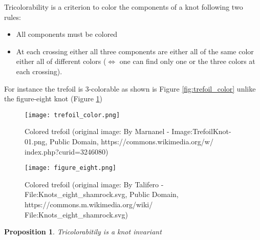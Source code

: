 \documentclass[12pt, a4paper]{article}
\newtheorem{proposition}{Proposition}
\begin{document}
Tricolorability is a criterion to color the components of a knot following two rules:

\begin{itemize}
  \item All components must be colored
  \item At each crossing either all three components are either all of the same color either all of different colors ($\Longleftrightarrow$ one can find only one or the three colors at each crossing). 
\end{itemize}

For instance the trefoil is 3-colorable as shown is Figure \ref{fig:trefoil_color} unlike the figure-eight knot (Figure \ref{fig:figure8})\\


\begin{figure}[H]
  \begin{minipage}[c]{.4\textwidth}
    \centering
    \texttt{[image: trefoil\_color.png]}
    \caption{Colored trefoil (original image: By Marnanel - Image:TrefoilKnot-01.png, Public Domain, https://commons.wikimedia.org/w/ index.php?curid=3246080)}
    \label{fig:trefoil_color}
  \end{minipage}
  \hfill
  \begin{minipage}[c]{.4\textwidth}
    \centering
    \texttt{[image: figure\_eight.png]}
    \caption{Colored trefoil (original image: By Talifero - File:Knots\_eight\_shamrock.svg, Public Domain, https://commons.m.wikimedia.org/wiki/ File:Knots\_eight\_shamrock.svg)}
    \label{fig:figure8}
  \end{minipage}  
\end{figure}

\begin{proposition}
  Tricolorabitily is a knot invariant
\end{proposition}
\end{document}
